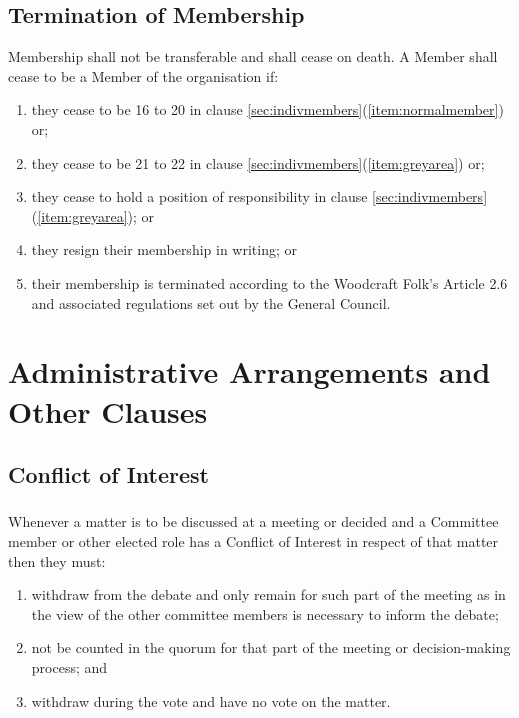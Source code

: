 \documentclass[a4paper, 11pt]{report}
\begin{document}
\subsection{Termination of Membership}
Membership shall not be transferable and shall cease on death. A Member shall cease to be
a Member of the organisation if:
\begin{enumerate}[\hspace{0.5cm}(a)]
\item they cease to be 16 to 20 in clause \ref{sec:indivmembers}(\ref{item:normalmember}) or;
\item they cease to be 21 to 22 in clause \ref{sec:indivmembers}(\ref{item:greyarea}) or;
\item they cease to hold a position of responsibility in clause \ref{sec:indivmembers}(\ref{item:greyarea}); or
\item they resign their membership in writing; or
\item their membership is terminated according to the Woodcraft Folk's Article 2.6 and associated regulations set out by the General Council.
\end{enumerate}

\section{Administrative Arrangements and Other Clauses}
\label{sec:admin}
\subsection{Conflict of Interest}
\subsubsection{}
Whenever a matter is to be discussed at a meeting or decided and a Committee member or other elected role has a Conflict of Interest in respect of that matter then they must:
\begin{enumerate}[\hspace{0.5cm}(a)]
\item withdraw from the debate and only remain for such part of the meeting as in the view of the other committee members is necessary to inform the debate;
\item not be counted in the quorum for that part of the meeting or decision-making process; and
\item withdraw during the vote and have no vote on the matter.
\end{enumerate}
\end{document}
